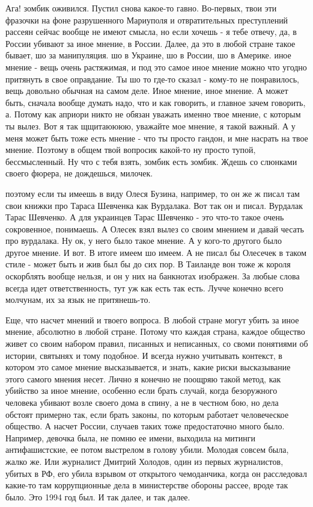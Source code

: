 Ага! зомбик оживился. Пустил снова какое-то гавно. Во-первых, твои эти фразочки
на фоне разрушенного Мариуполя и отвратительных преступлений рассеян сейчас
вообще не имеют смысла, но если хочешь - я тебе отвечу, да, в России убивают за
иное мнение, в России. Далее, да это в любой стране такое бывает, шо за
манипуляция. шо в Украине, шо в России, шо в Америке. иное мнение - вещь очень
растяжимая, и под это самое иное мнение можно что угодно притянуть в свое
оправдание. Ты шо то где-то сказал - кому-то не понравилось, вещь довольно
обычная на самом деле. Иное мнение, иное мнение. А может быть, сначала вообще
думать надо, что и как говорить, и главное зачем говорить, а. Потому как
априори никто не обязан уважать именно твое мнение, с которым ты вылез. Вот я
так щщитаюююю, уважайте мое мнение, я такой важный. А у меня может быть тоже
есть мнение - что ты просто гандон, и мне насрать на твое мнение. Поэтому в
общем твой вопросик какой-то ну просто тупой, бессмысленный. Ну что с тебя
взять, зомбик есть зомбик. Ждешь со слюнками своего фюрера, не дождешься,
милочек.

поэтому если ты имеешь в виду Олеся Бузина, например, то он же ж писал там свои
книжки про Тараса Шевченка как Вурдалака. Вот так он и писал. Вурдалак Тарас
Шевченко. А для украинцев Тарас Шевченко - это что-то такое очень сокровенное,
понимаешь. А Олесек взял вылез со своим мнением и давай чесать про вурдалака.
Ну ок, у него было такое мнение. А у кого-то другого было другое мнение. И вот.
В итоге имеем шо имеем. А не писал бы Олесечек в таком стиле - может быть и жив
был бы до сих пор. В Таиланде вон тоже ж короля оскорблять вообще нельзя, и он
у них на банкнотах изображен. За любые слова всегда идет ответственность, тут
уж как есть так есть. Лучче конечно всего молчунам, их за язык не притянешь-то.

Еще, что насчет мнений и твоего вопроса. В любой стране могут убить за иное
мнение, абсолютно в любой стране. Потому что каждая страна, каждое общество
живет со своим набором правил, писанных и неписанных, со своми понятиями об
истории, святынях и тому подобное. И всегда нужно учитывать контекст, в котором
это самое мнение высказывается, и знать, какие риски высказывание этого самого
мнения несет. Лично я конечно не поощряю такой метод, как убийство за иное
мнение, особенно если брать случай, когда безоружного человека убивают возле
своего дома в спину, а не в честном бою, но дела обстоят примерно так, если
брать законы, по которым работает человеческое общество. А насчет России,
случаев таких тоже предостаточно много было. Например, девочка была, не помню
ее имени, выходила на митинги антифашистские, ее потом выстрелом в голову
убили. Молодая совсем была, жалко же. Или журналист Дмитрий Холодов, один из
первых журналистов, убитых в РФ, его убила взрывом от открытого чемоданчика,
когда он расследовал какие-то там коррупционные дела в министерстве обороны
рассее, вроде так было. Это 1994 год был. И так далее, и так далее.

